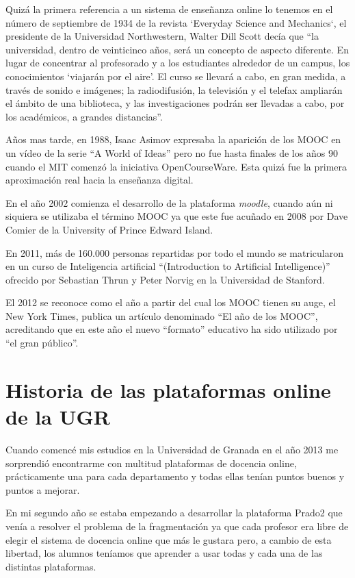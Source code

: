 Quizá la primera referencia a un sistema de enseñanza online lo tenemos en el número de septiembre de 1934 de la revista ‘Everyday Science and Mechanics‘, el presidente de la Universidad Northwestern, Walter Dill Scott decía que ``la universidad, dentro de veinticinco años, será un concepto de aspecto diferente. En lugar de concentrar al profesorado y a los estudiantes alrededor de un campus, los conocimientos ‘viajarán por el aire’. El curso se llevará a cabo, en gran medida, a través de sonido e imágenes; la radiodifusión, la televisión y el telefax ampliarán el ámbito de una biblioteca, y las investigaciones podrán ser llevadas a cabo, por los académicos, a grandes distancias''\cite{art_12}.

\bigskip
Años mas tarde, en 1988, Isaac Asimov expresaba la aparición de los MOOC en un vídeo de la serie ``A World of Ideas'' pero no fue hasta finales de los años 90 cuando el MIT comenzó la iniciativa OpenCourseWare. Esta quizá fue la primera aproximación real hacia la enseñanza digital.

\bigskip
En el año 2002 comienza el desarrollo de la plataforma \textit{moodle}, cuando aún ni siquiera se utilizaba el término MOOC ya que este fue acuñado en 2008 por Dave Comier de la University of Prince Edward Island.

\bigskip
En 2011, más de 160.000 personas repartidas por todo el mundo se matricularon en un curso de Inteligencia artificial ``(Introduction to Artificial Intelligence)'' ofrecido por Sebastian Thrun y Peter Norvig en la Universidad de Stanford.

\bigskip
El 2012 se reconoce como el año a partir del cual los MOOC tienen su auge, el New York Times, publica un artículo denominado ``El año de los MOOC'', acreditando que en este año el nuevo ``formato'' educativo ha sido utilizado por ``el gran público''.

\section{Historia de las plataformas online de la UGR}

Cuando comencé mis estudios en la Universidad de Granada en el año 2013 me sorprendió encontrarme con multitud plataformas de docencia online, prácticamente una para cada departamento y todas ellas tenían puntos buenos y puntos a mejorar.

\bigskip
En mi segundo año se estaba empezando a desarrollar la plataforma Prado2 que venía a resolver el problema de la fragmentación ya que cada profesor era libre de elegir el sistema de docencia online que más le gustara pero, a cambio de esta libertad, los alumnos teníamos que aprender a usar todas y cada una de las distintas plataformas.

